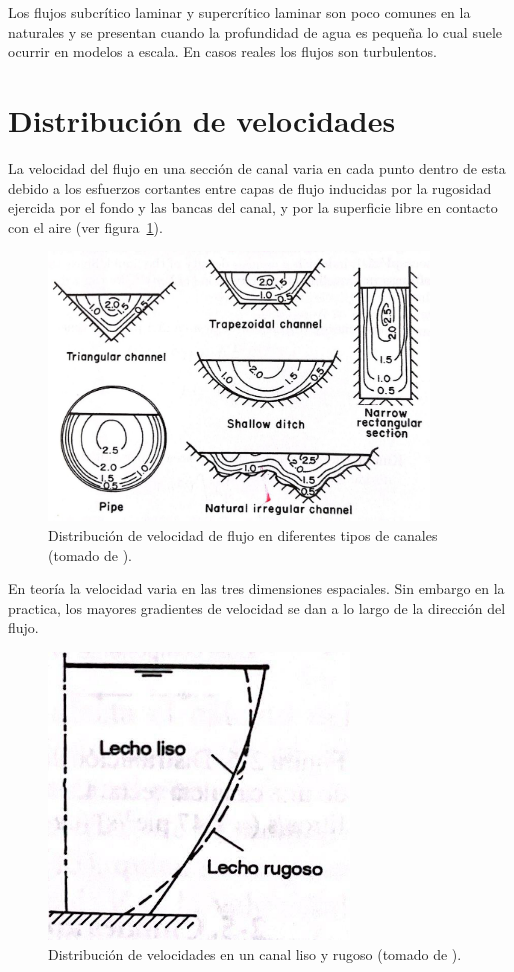 \documentclass[11pt, oneside]{article}
\begin{document}
Los flujos subcr\'itico laminar y supercr\'itico laminar son poco comunes en la naturales y se presentan cuando la profundidad de agua es pequeña lo cual suele ocurrir en modelos a escala. En casos reales los flujos son turbulentos.

\section{Distribuci\'on de velocidades}%
La velocidad del flujo en una secci\'on de canal varia en cada punto dentro de esta debido a los esfuerzos cortantes entre capas de flujo inducidas por la rugosidad ejercida por el fondo y las bancas del canal, y por la superficie libre en contacto con el aire (ver figura~\ref{fig5}).

\begin{figure}[h]
\centering
\includegraphics[width=0.9\textwidth]{fig5.jpeg}
\caption{Distribuci\'on de velocidad de flujo en diferentes tipos de canales (tomado de \cite{Chau}).}
\label{fig5}
\end{figure}


En teor\'ia la velocidad varia en las tres dimensiones espaciales. Sin embargo en la practica, los mayores gradientes de velocidad se dan a lo largo de la direcci\'on del flujo. 
\begin{figure}[h]
\centering
\includegraphics[width=8cm]{fig6.jpeg}
\caption{Distribuci\'on de velocidades en un canal liso y rugoso (tomado de \cite{VChow}).}
\label{fig6}
\end{figure}
\end{document}
